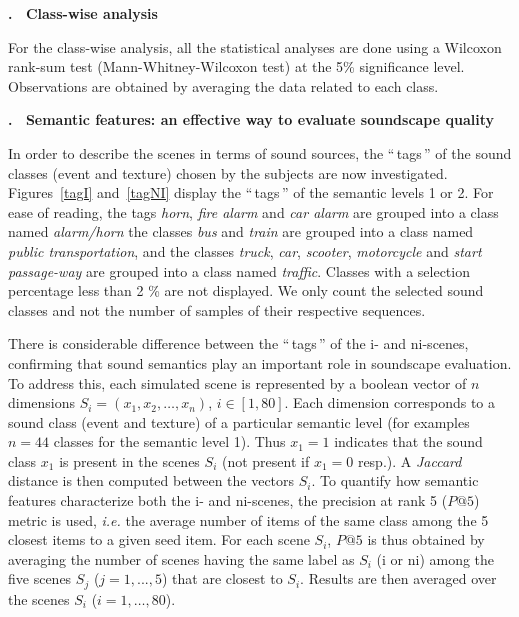 \documentclass[12pt, titlepage, reqno]{article} %
\renewcommand{\section}[1]{\medskip \addtocounter{section}{1}\raggedright 
     \textbf{\Roman{section}. \ #1}\medskip \setcounter{subsection}{0}
    \setlength{\parindent}{5ex}
 }
\renewcommand{\subsection}[1]{\medskip \addtocounter{subsection}{1}\raggedright
    \textbf{\Alph{subsection}. \ #1} \medskip \setcounter{subsubsection}{0}\setlength{\parindent}{5ex}
}
\begin{document}
\section{Class-wise analysis}
For the class-wise analysis, all the statistical analyses are done using a Wilcoxon rank-sum test (Mann-Whitney-Wilcoxon test) at the 5\% significance level. Observations are obtained by averaging the data related to each class.

\subsection{Semantic features: an effective way to evaluate soundscape quality}
\label{Semantic Tag}

In order to describe the scenes in terms of sound sources, the ``\,tags\,''  of the sound classes (event and texture) chosen by the subjects are now investigated. Figures~\ref{tagI} and~\ref{tagNI} display the ``\,tags\,'' of the semantic levels 1 or 2. For ease of reading, the tags \textit{horn}, \textit{fire alarm} and \textit{car alarm} are grouped into a class named \textit{alarm/horn} the classes \textit{bus} and \textit{train} are grouped into a class named \textit{public transportation}, and the classes \textit{truck}, \textit{car}, \textit{scooter}, \textit{motorcycle} and \textit{start passage-way}  are grouped into a class named \textit{traffic}. Classes with a selection percentage less than 2 \% are not displayed.  We only count the selected sound classes and not the number of samples of their respective sequences.

There is considerable difference between the ``\,tags\,'' of the i- and ni-scenes, confirming that sound semantics play an important role in soundscape evaluation. To address this, each simulated scene is represented by a boolean vector of  $n$ dimensions $S_i = (x_1, x_2, \ldots{}, x_{n})$, $i\in[1,80]$. Each dimension corresponds to a sound class (event and texture) of a particular semantic level (for examples $n=44$ classes for the semantic level 1). Thus $x_1 = 1$ indicates that the sound class $x_1$ is present in the scenes $S_i$ (not present if $x_1=0$ resp.). A \textit{Jaccard} distance is then computed between the vectors $S_i$. To quantify how semantic features characterize both the i- and ni-scenes, the precision at rank 5 ($P@5$) metric is used, \textit{i.e.} the average number of items of the same class among the 5 closest items to a given seed item. For each scene $S_i$, $P@5$ is thus obtained by averaging the number of scenes having the same label as $S_i$ (i or ni) among the five scenes $S_j$ ($j=1,...,5$) that are closest to $S_i$. Results are then averaged over the scenes $S_i$ ($i=1, \ldots{}, 80$). 
\end{document}
